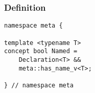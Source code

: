 
\subsubsection{Definition}

\begin{verbatim}
namespace meta {

template <typename T>
concept bool Named =
	Declaration<T> &&
	meta::has_name_v<T>;

} // namespace meta
\end{verbatim}
